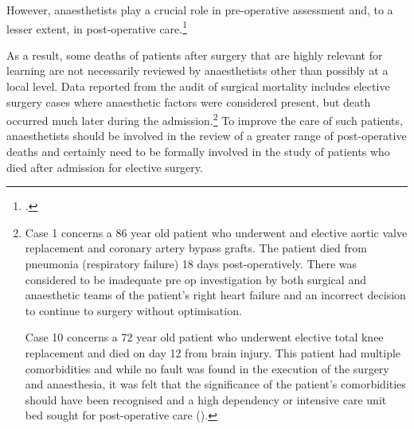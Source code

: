 \documentclass[FrontPage]{grattan}
\begin{document}
However, anaesthetists play a crucial role in pre-operative assessment and, to a lesser extent, in post-operative care.\footcite{RN43}

As a result, some deaths of patients after surgery that are highly relevant for learning are not necessarily reviewed by anaesthetists other than possibly at a local level. Data reported from the audit of surgical mortality includes elective surgery cases where anaesthetic factors were considered present, but death occurred much later during the admission.\footnote{Case 1 concerns a 86 year old patient who underwent and elective aortic valve replacement and coronary artery bypass grafts. The patient died from pneumonia (respiratory failure) 18 days post-operatively. There was considered to be inadequate pre op investigation by both surgical and anaesthetic teams of the patient’s right heart failure and an incorrect decision to continue to surgery without optimisation.

Case 10 concerns a 72 year old patient who underwent elective total knee replacement and died on day 12 from brain injury. This patient had multiple comorbidities and while no fault was found in the execution of the surgery and anaesthesia, it was felt that the significance of the patient’s comorbidities should have been recognised and a high dependency or intensive care unit bed sought for post-operative care (\textcite{VASM2017}).}
To improve the care of such patients, anaesthetists should be involved in the review of a greater range of post-operative deaths and certainly need to be formally involved in the study of patients who died after admission for elective surgery.
\end{document}
